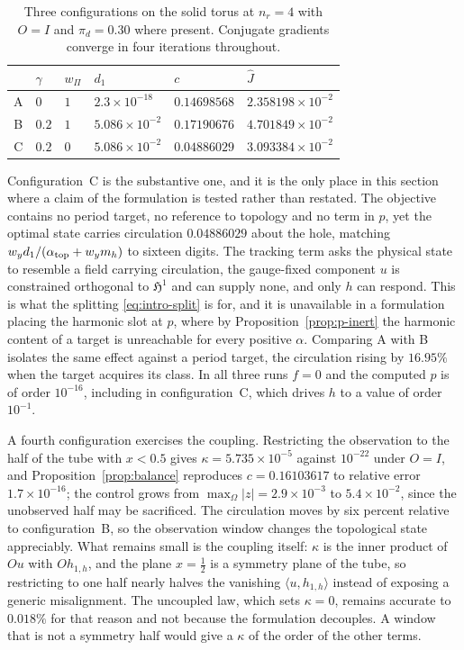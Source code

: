 \documentclass{article}
\newcommand{\HH}{\mathfrak H}
\newcommand{\ip}[2]{\langle #1,#2\rangle}
\begin{document}
\begin{table}[htbp]
\centering
\begin{tabular}{clllll}
\toprule
 & $\gamma$ & $w_{\Pi}$ & $d_{1}$ & $c$ & $\widehat J$\\
\midrule
A & $0$   & $1$ & $2.3\times10^{-18}$ & $0.14698568$
  & $2.358198\times10^{-2}$\\
B & $0.2$ & $1$ & $5.086\times10^{-2}$ & $0.17190676$
  & $4.701849\times10^{-2}$\\
C & $0.2$ & $0$ & $5.086\times10^{-2}$ & $0.04886029$
  & $3.093384\times10^{-2}$\\
\bottomrule
\end{tabular}
\caption{Three configurations on the solid torus at $n_{r}=4$ with $O=I$ and
$\pi_{d}=0.30$ where present. Conjugate gradients converge in four iterations
throughout.}
\label{tab:torus-runs}
\end{table}

Configuration~C is the substantive one, and it is the only place in this
section where a claim of the formulation is tested rather than restated. The
objective contains no period target, no reference to topology and no term in
$p$, yet the optimal state carries circulation $0.04886029$ about the hole,
matching $w_{y}d_{1}/(\alpha_{\rm top}+w_{y}m_{h})$ to sixteen digits. The
tracking term asks the physical state to resemble a field carrying
circulation, the gauge-fixed component $u$ is constrained orthogonal to
$\HH^{1}$ and can supply none, and only $h$ can respond. This is what the
splitting \eqref{eq:intro-split} is for, and it is unavailable in a
formulation placing the harmonic slot at $p$, where by
Proposition~\ref{prop:p-inert} the harmonic content of a target is unreachable
for every positive $\alpha$. Comparing A with B isolates the same effect
against a period target, the circulation rising by $16.95\%$ when the target
acquires its class. In all three runs $f=0$ and the computed $p$ is of order
$10^{-16}$, including in configuration~C, which drives $h$ to a value of order
$10^{-1}$.

A fourth configuration exercises the coupling. Restricting the observation to
the half of the tube with $x<0.5$ gives $\kappa=5.735\times10^{-5}$ against
$10^{-22}$ under $O=I$, and Proposition~\ref{prop:balance} reproduces
$c=0.16103617$ to relative error $1.7\times10^{-16}$; the control grows from
$\max_{\Omega}|z|=2.9\times10^{-3}$ to $5.4\times10^{-2}$, since the
unobserved half may be sacrificed. The circulation moves by six percent
relative to configuration~B, so the observation window changes the topological
state appreciably. What remains small is the coupling itself: $\kappa$ is the
inner product of $Ou$ with $Oh_{1,h}$, and the plane $x=\tfrac12$ is a
symmetry plane of the tube, so restricting to one half nearly halves the
vanishing $\ip{u}{h_{1,h}}$ instead of exposing a generic misalignment. The
uncoupled law, which sets $\kappa=0$, remains accurate to $0.018\%$ for that
reason and not because the formulation decouples. A window that is not a
symmetry half would give a $\kappa$ of the order of the other terms.
\end{document}

